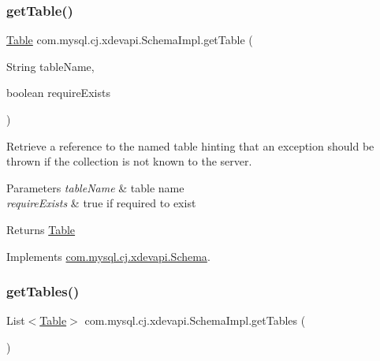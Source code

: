 \subsubsection{\texorpdfstring{get\+Table()}{getTable()}\hspace{0.1cm}{\footnotesize\ttfamily [2/2]}}
{\footnotesize\ttfamily \mbox{\hyperlink{interfacecom_1_1mysql_1_1cj_1_1xdevapi_1_1_table}{Table}} com.\+mysql.\+cj.\+xdevapi.\+Schema\+Impl.\+get\+Table (\begin{DoxyParamCaption}\item[{String}]{table\+Name,  }\item[{boolean}]{require\+Exists }\end{DoxyParamCaption})}

Retrieve a reference to the named table hinting that an exception should be thrown if the collection is not known to the server.


\begin{DoxyParams}{Parameters}
{\em table\+Name} & table name \\
\hline
{\em require\+Exists} & true if required to exist \\
\hline
\end{DoxyParams}
\begin{DoxyReturn}{Returns}
\mbox{\hyperlink{interfacecom_1_1mysql_1_1cj_1_1xdevapi_1_1_table}{Table}} 
\end{DoxyReturn}


Implements \mbox{\hyperlink{interfacecom_1_1mysql_1_1cj_1_1xdevapi_1_1_schema_a555b3596a60f576785190870c67f8ef5}{com.\+mysql.\+cj.\+xdevapi.\+Schema}}.

\mbox{\label{classcom_1_1mysql_1_1cj_1_1xdevapi_1_1_schema_impl_a437e825fdc3d104e630dda918ccbfa72}} 
\subsubsection{\texorpdfstring{get\+Tables()}{getTables()}\hspace{0.1cm}{\footnotesize\ttfamily [1/2]}}
{\footnotesize\ttfamily List$<$\mbox{\hyperlink{interfacecom_1_1mysql_1_1cj_1_1xdevapi_1_1_table}{Table}}$>$ com.\+mysql.\+cj.\+xdevapi.\+Schema\+Impl.\+get\+Tables (\begin{DoxyParamCaption}{ }\end{DoxyParamCaption})}

